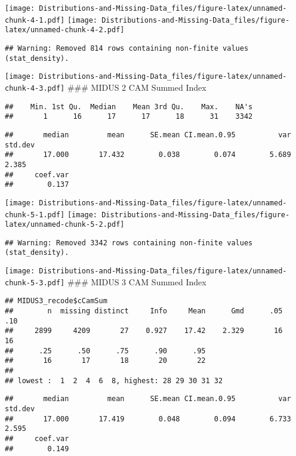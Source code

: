 \documentclass[
]{article}
\begin{document}
\texttt{[image: Distributions-and-Missing-Data\_files/figure-latex/unnamed-chunk-4-1.pdf]}
\texttt{[image: Distributions-and-Missing-Data\_files/figure-latex/unnamed-chunk-4-2.pdf]}

\begin{verbatim}
## Warning: Removed 814 rows containing non-finite values (stat_density).
\end{verbatim}

\texttt{[image: Distributions-and-Missing-Data\_files/figure-latex/unnamed-chunk-4-3.pdf]}
\#\#\# MIDUS 2 CAM Summed Index

\begin{verbatim}
##    Min. 1st Qu.  Median    Mean 3rd Qu.    Max.    NA's 
##       1      16      17      17      18      31    3342
\end{verbatim}

\begin{verbatim}
##       median         mean      SE.mean CI.mean.0.95          var      std.dev 
##       17.000       17.432        0.038        0.074        5.689        2.385 
##     coef.var 
##        0.137
\end{verbatim}

\texttt{[image: Distributions-and-Missing-Data\_files/figure-latex/unnamed-chunk-5-1.pdf]}
\texttt{[image: Distributions-and-Missing-Data\_files/figure-latex/unnamed-chunk-5-2.pdf]}

\begin{verbatim}
## Warning: Removed 3342 rows containing non-finite values (stat_density).
\end{verbatim}

\texttt{[image: Distributions-and-Missing-Data\_files/figure-latex/unnamed-chunk-5-3.pdf]}
\#\#\# MIDUS 3 CAM Summed Index

\begin{verbatim}
## MIDUS3_recode$cCamSum 
##        n  missing distinct     Info     Mean      Gmd      .05      .10 
##     2899     4209       27    0.927    17.42    2.329       16       16 
##      .25      .50      .75      .90      .95 
##       16       17       18       20       22 
## 
## lowest :  1  2  4  6  8, highest: 28 29 30 31 32
\end{verbatim}

\begin{verbatim}
##       median         mean      SE.mean CI.mean.0.95          var      std.dev 
##       17.000       17.419        0.048        0.094        6.733        2.595 
##     coef.var 
##        0.149
\end{verbatim}
\end{document}
